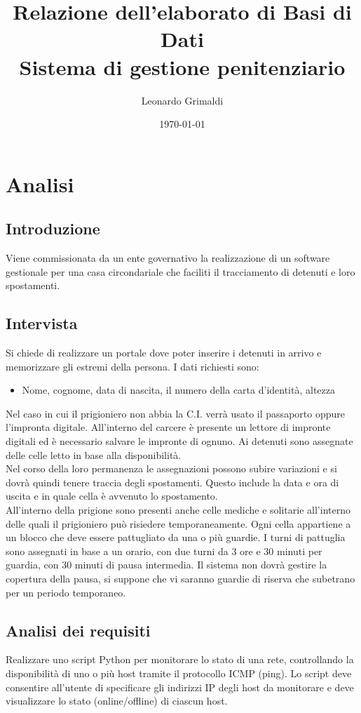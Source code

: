 \documentclass[a4paper,12pt]{report}
\title{Relazione dell'elaborato di Basi di Dati
    \\ Sistema di gestione penitenziario}
\author{Leonardo Grimaldi}
\date{\today}
\begin{document}
\maketitle
\tableofcontents
\chapter{Analisi}
\section{Introduzione}
Viene commissionata da un ente governativo la realizzazione di un software gestionale per una casa circondariale che faciliti il tracciamento di detenuti e loro spostamenti.
\section{Intervista}
Si chiede di realizzare un portale dove poter inserire i detenuti in arrivo e memorizzare gli estremi della persona.
%
I dati richiesti sono:
\begin{itemize}
    \item Nome, cognome, data di nascita, il numero della carta d'identità, altezza
\end{itemize}
Nel caso in cui il prigioniero non abbia la C.I. verrà usato il passaporto oppure l'impronta digitale.
%
All'interno del carcere è presente un lettore di impronte digitali ed è necessario salvare le impronte di ognuno.
%
Ai detenuti sono assegnate delle celle letto in base alla disponibilità.
%
\\Nel corso della loro permanenza le assegnazioni possono subire variazioni e si dovrà quindi tenere traccia degli spostamenti.
%
Questo include la data e ora di uscita e in quale cella è avvenuto lo spostamento.
%
\\All'interno della prigione sono presenti anche celle mediche e solitarie all'interno delle quali il prigioniero può risiedere temporaneamente.
%
Ogni cella appartiene a un blocco che deve essere pattugliato da una o più guardie.
%
I turni di pattuglia sono assegnati in base a un orario, con due turni da 3 ore e 30 minuti per guardia, con 30 minuti di pausa intermedia. Il sistema non dovrà gestire la copertura della pausa, si suppone che vi saranno guardie di riserva che subetrano per un periodo temporaneo.


\section{Analisi dei requisiti}

Realizzare uno script Python per monitorare lo stato di una rete, controllando la disponibilità di uno o più host tramite il protocollo ICMP (ping).
%
Lo script deve consentire all'utente di specificare gli indirizzi IP degli host da monitorare e deve visualizzare lo stato (online/offline) di ciascun host.
\end{document}
